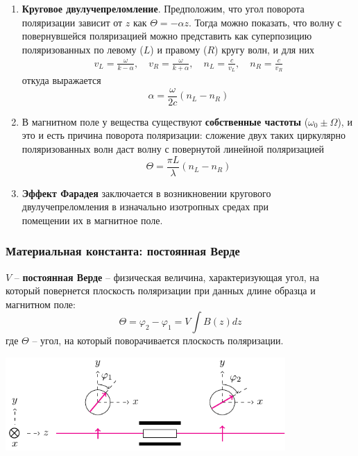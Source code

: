 \documentclass[10pt,pdf,hyperref={unicode}, dvipsnames]{beamer}
\begin{document}

\begin{frame}[t]
	\begin{enumerate}
		\item \textbf{Круговое двулучепреломление}. Предположим, что угол поворота поляризации зависит от $z$ как
		      $\Theta=-\alpha z$. Тогда можно показать, что волну с повернувшейся поляризацией можно представить как суперпозицию поляризованных по левому ($L$) и правому ($R$) кругу волн, и для них
		      \begin{gather*}
			      v_L=\frac{\omega}{k-\alpha},
			      \quad
			      v_R=\frac{\omega}{k+\alpha},
			      \quad
			      n_L=\frac{c}{v_L},
			      \quad
			      n_R=\frac{c}{v_R}
		      \end{gather*}
		      откуда выражается
		      \begin{equation*}
			      \alpha=\frac{\omega}{2c}(n_L-n_R)
		      \end{equation*}
		\item В магнитном поле у вещества существуют \textbf{собственные частоты} ($\omega_0\pm\Omega$),
		      и это и есть причина поворота поляризации: сложение двух таких циркулярно поляризованных волн даст волну с повернутой линейной поляризацией
		      \begin{equation*}
			      \Theta=\frac{\pi L}{\lambda}(n_L-n_R)
		      \end{equation*}
		\item \textbf{Эффект Фарадея} заключается в возникновении кругового двулучепреломления в изначально изотропных средах при \\помещении их в магнитное поле.
	\end{enumerate}
\end{frame}


\begin{frame}
	\frametitle{Материальная константа: постоянная Верде}
	$V$ -- \textbf{постоянная Верде} -- физическая величина, характеризующая угол, на который повернется плоскость поляризации при данных длине образца и магнитном поле:
	\begin{equation*}
		\Theta=\varphi_2-\varphi_1=V \int B(z)dz
	\end{equation*}
	где $\Theta$ -- угол, на который поворачивается плоскость поляризации.
	\begin{center}
		\includegraphics[width=0.8\textwidth]{images/rotpol}
	\end{center}
\end{frame}
\end{document}
